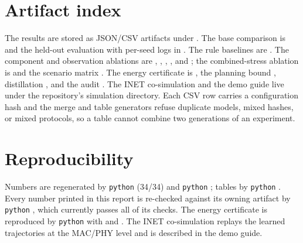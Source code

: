 \documentclass[conference]{IEEEtran}
\begin{document}
\section*{Artifact index}
The results are stored as JSON/CSV artifacts under . The base comparison is  and the held-out evaluation  with per-seed logs in . The rule baselines are . The component and observation ablations are , , , , and ; the combined-stress ablation is  and the scenario matrix . The energy certificate is , the planning bound , distillation , and the audit . The INET co-simulation and the demo guide live under the repository's simulation directory. Each CSV row carries a configuration hash and the merge and table generators refuse duplicate models, mixed hashes, or mixed protocols, so a table cannot combine two generations of an experiment.

\section*{Reproducibility}
Numbers are regenerated by \texttt{python}  (34/34) and \texttt{python} ; tables by \texttt{python} . Every number printed in this report is re-checked against its owning artifact by \texttt{python} , which currently passes all of its checks. The energy certificate is reproduced by \texttt{python}  with  and . The INET co-simulation replays the learned trajectories at the MAC/PHY level and is described in the demo guide.
\end{document}
